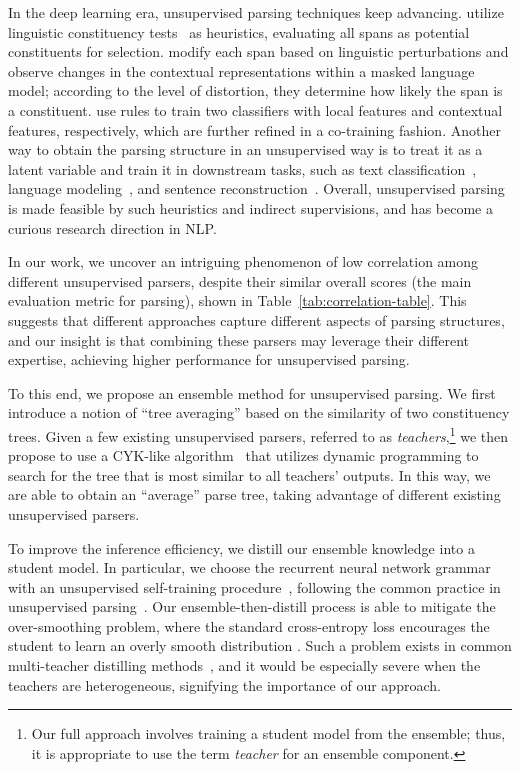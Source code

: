 \documentclass{article}
\begin{document}
In the deep learning era, unsupervised parsing techniques keep advancing. \citet{cao-etal-2020-unsupervised} utilize linguistic constituency tests~\citep{fromkin2003introduction} as heuristics, evaluating all spans as potential constituents for selection. \citet{li-lu-2023-contextual} modify each span based on linguistic perturbations and observe changes in the contextual representations within a masked language model; according to the level of distortion, they determine how likely the span is a constituent. \citet{maveli-cohen-2022-co} use rules to train two classifiers with local features and contextual features, respectively, which are further refined in a co-training fashion. Another way to obtain the parsing structure in an unsupervised way is to treat it as a latent variable and train it in downstream tasks, such as text classification~\citep{li-etal-2019-imitation}, language modeling~\citep{shen2018ordered,kim-etal-2019-unsupervised}, and sentence reconstruction~\citep{drozdov-etal-2019-unsupervised-latent,kim-etal-2019-compound}. Overall, unsupervised parsing is made feasible by such heuristics and indirect supervisions, and has become a curious research direction in NLP.

In our work, we uncover an intriguing phenomenon of low correlation among different unsupervised parsers, despite their similar overall  scores (the main evaluation metric for parsing), shown in Table~\ref{tab:correlation-table}. This suggests that different approaches capture different aspects of parsing structures, and our insight is that combining these parsers may leverage their different expertise, achieving higher performance for unsupervised parsing.

To this end, we propose an ensemble method for unsupervised parsing. We first introduce a notion of ``tree averaging'' based on the similarity of two constituency trees. Given a few existing unsupervised parsers, referred to as \textit{teachers},\footnote{Our full approach involves training a student model from the ensemble; thus, it is appropriate to use the term \textit{teacher} for an ensemble component.} we then propose to use a CYK-like algorithm~\citep{Kasami1965AnER,YOUNGER1967189,MANACHER1978127,sennrich-2014-cyk} that utilizes dynamic programming to search for the tree that is most similar to all teachers' outputs. In this way, we are able to obtain an ``average'' parse tree, taking advantage of different existing unsupervised parsers.

To improve the inference efficiency, we distill our ensemble knowledge into a student model. In particular, we choose the recurrent neural network grammar~\citep[RNNG;][]{dyer-etal-2016-recurrent} with an unsupervised self-training procedure~\citep[URNNG;][]{kim-etal-2019-unsupervised}, following the common practice in unsupervised parsing~\citep{kim-etal-2019-compound,cao-etal-2020-unsupervised}. Our ensemble-then-distill process is able to mitigate the over-smoothing problem, where the standard cross-entropy loss encourages the student to learn an overly smooth distribution \citep{wen-etal-2023-f}. Such a problem exists in common multi-teacher distilling methods~\citep{wu-etal-2021-one}, and it would be especially severe when the teachers are heterogeneous, signifying the importance of our approach.
\end{document}
